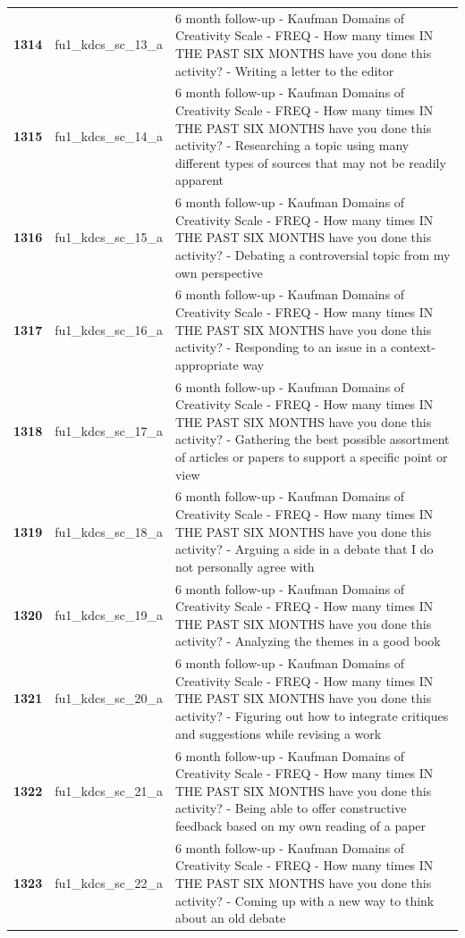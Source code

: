 \documentclass[
  letterpaper,
  DIV=11,
  numbers=noendperiod]{scrartcl}
\begin{document}
\begin{longtable}[t]{>{}cll}
\textbf{1314} & fu1\_kdcs\_sc\_13\_a & 6 month follow-up - Kaufman Domains of Creativity Scale - FREQ - How many times IN THE PAST SIX MONTHS have you done this activity? - Writing a letter to the editor\\
\textbf{1315} & fu1\_kdcs\_sc\_14\_a & 6 month follow-up - Kaufman Domains of Creativity Scale - FREQ - How many times IN THE PAST SIX MONTHS have you done this activity? - Researching a topic using many different types of sources that may not be readily apparent\\
\addlinespace
\textbf{1316} & fu1\_kdcs\_sc\_15\_a & 6 month follow-up - Kaufman Domains of Creativity Scale - FREQ - How many times IN THE PAST SIX MONTHS have you done this activity? - Debating a controversial topic from my own perspective\\
\textbf{1317} & fu1\_kdcs\_sc\_16\_a & 6 month follow-up - Kaufman Domains of Creativity Scale - FREQ - How many times IN THE PAST SIX MONTHS have you done this activity? - Responding to an issue in a context-appropriate way\\
\textbf{1318} & fu1\_kdcs\_sc\_17\_a & 6 month follow-up - Kaufman Domains of Creativity Scale - FREQ - How many times IN THE PAST SIX MONTHS have you done this activity? - Gathering the best possible assortment of articles or papers to support a specific point or view\\
\textbf{1319} & fu1\_kdcs\_sc\_18\_a & 6 month follow-up - Kaufman Domains of Creativity Scale - FREQ - How many times IN THE PAST SIX MONTHS have you done this activity? - Arguing a side in a debate that I do not personally agree with\\
\textbf{1320} & fu1\_kdcs\_sc\_19\_a & 6 month follow-up - Kaufman Domains of Creativity Scale - FREQ - How many times IN THE PAST SIX MONTHS have you done this activity? - Analyzing the themes in a good book\\
\addlinespace
\textbf{1321} & fu1\_kdcs\_sc\_20\_a & 6 month follow-up - Kaufman Domains of Creativity Scale - FREQ - How many times IN THE PAST SIX MONTHS have you done this activity? - Figuring out how to integrate critiques and suggestions while revising a work\\
\textbf{1322} & fu1\_kdcs\_sc\_21\_a & 6 month follow-up - Kaufman Domains of Creativity Scale - FREQ - How many times IN THE PAST SIX MONTHS have you done this activity? - Being able to offer constructive feedback based on my own reading of a paper\\
\textbf{1323} & fu1\_kdcs\_sc\_22\_a & 6 month follow-up - Kaufman Domains of Creativity Scale - FREQ - How many times IN THE PAST SIX MONTHS have you done this activity? - Coming up with a new way to think about an old debate\\

\end{longtable}
\end{document}
